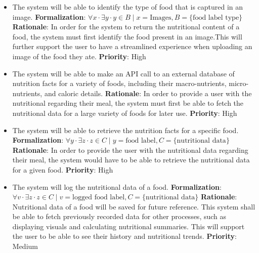 \documentclass[12pt]{article}
\newcounter{FRCounter}
\newcommand{\FillFRNumber}{\textbf{FR\arabic{FRCounter}.} \stepcounter{FRCounter}}
\begin{document}
\begin{itemize}
    \item [\FillFRNumber] The system will be able to identify the type of food that is captured in an image.\newline 
    \textbf{Formalization}: $\forall x \cdot \exists y \cdot y \in B \mid x = \text{Images}, B = \{\text{food label type}\}$\newline
    \textbf{Rationale}: In order for the system to return the nutritional content of a food, the system must first identify the food present in an image.This will further support the user to have a streamlined experience when uploading an image of the food they ate. \newline
    \textbf{Priority}: High
\end{itemize}

\begin{itemize}
    \item [\FillFRNumber] The system will be able to make an API call to an external database of nutrition facts for a variety of foods, including their macro-nutrients, micro-nutrients, and caloric details.\newline
    \textbf{Rationale}: In order to provide a user with the nutritional regarding their meal, the system must first be able to fetch the nutritional data for a large variety of foods for later use.\newline
    \textbf{Priority}: High
\end{itemize}

\begin{itemize}
    \item [\FillFRNumber] The system will be able to retrieve the nutrition facts for a specific food.\newline
    \textbf{Formalization}: $\forall y \cdot \exists z \cdot z \in C \mid y = \text{food label}, C = \{\text{nutritional data}\}$\newline
    \textbf{Rationale}: In order to provide the user with the nutritional data regarding their meal, the system would have to be able to retrieve the nutritional data for a given food.\newline
    \textbf{Priority}: High
\end{itemize}

\begin{itemize}
	\item [\FillFRNumber] The system will log the nutritional data of a food.\newline
	\textbf{Formalization}: $\forall v \cdot \exists z \cdot z \in C \mid v = \text{logged food label}, C = \{\text{nutritional data}\}$\newline
	\textbf{Rationale}: Nutritional data of a food will be saved for future reference. This system shall be able to fetch previously recorded data for other processes, such as displaying visuals and calculating nutritional summaries. This will support the user to be able to see their history and nutritional trends. \newline 
	\textbf{Priority}: Medium
\end{itemize}
\end{document}
